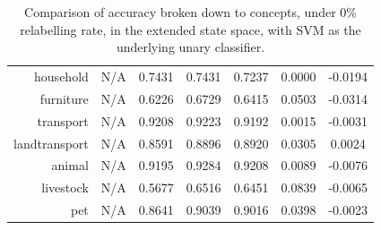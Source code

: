 \documentclass[11pt,a4paper]{article}
\begin{document}
\begin{table}[htbp]
\begin{tabular}{r|c|c|c|c|c|c}
household     & N/A    & 0.7431 & 0.7431 & 0.7237 & 0.0000 & -0.0194\\
furniture     & N/A    & 0.6226 & 0.6729 & 0.6415 & 0.0503 & -0.0314\\
transport     & N/A    & 0.9208 & 0.9223 & 0.9192 & 0.0015 & -0.0031\\
landtransport & N/A    & 0.8591 & 0.8896 & 0.8920 & 0.0305 & 0.0024\\
animal        & N/A    & 0.9195 & 0.9284 & 0.9208 & 0.0089 & -0.0076\\
livestock     & N/A    & 0.5677 & 0.6516 & 0.6451 & 0.0839 & -0.0065\\
pet           & N/A    & 0.8641 & 0.9039 & 0.9016 & 0.0398 & -0.0023
\end{tabular}
\caption{Comparison of accuracy broken down to concepts, under 0\% relabelling rate, in the extended state space, with SVM as the underlying unary classifier.}
\label{tab:svm0acc}
\end{table}
\end{document}
